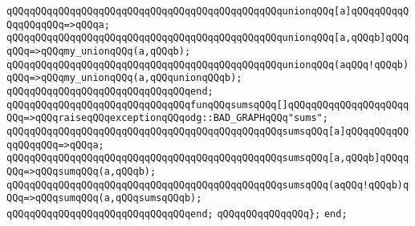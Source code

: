 \verb|qQQqqQQqqQQqqQQqqQQqqQQqqQQqqQQqqQQqqQQqqQQqqQQqunionqQQq[a]qQQqqQQqqQQqqQQqqQQq=>qQQqa;|\newline
\verb|qQQqqQQqqQQqqQQqqQQqqQQqqQQqqQQqqQQqqQQqqQQqqQQqunionqQQq[a,qQQqb]qQQqqQQq=>qQQqmy_unionqQQq(a,qQQqb);|\newline
\verb|qQQqqQQqqQQqqQQqqQQqqQQqqQQqqQQqqQQqqQQqqQQqqQQqunionqQQq(aqQQq!qQQqb)qQQq=>qQQqmy_unionqQQq(a,qQQqunionqQQqb);|\newline
\verb|qQQqqQQqqQQqqQQqqQQqqQQqqQQqqQQqend;|\newline
\newline
\verb|qQQqqQQqqQQqqQQqqQQqqQQqqQQqqQQqfunqQQqsumsqQQq[]qQQqqQQqqQQqqQQqqQQqqQQq=>qQQqraiseqQQqexceptionqQQqodg::BAD_GRAPHqQQq"sums";|\newline
\verb|qQQqqQQqqQQqqQQqqQQqqQQqqQQqqQQqqQQqqQQqqQQqqQQqsumsqQQq[a]qQQqqQQqqQQqqQQqqQQq=>qQQqa;|\newline
\verb|qQQqqQQqqQQqqQQqqQQqqQQqqQQqqQQqqQQqqQQqqQQqqQQqsumsqQQq[a,qQQqb]qQQqqQQq=>qQQqsumqQQq(a,qQQqb);|\newline
\verb|qQQqqQQqqQQqqQQqqQQqqQQqqQQqqQQqqQQqqQQqqQQqqQQqsumsqQQq(aqQQq!qQQqb)qQQq=>qQQqsumqQQq(a,qQQqsumsqQQqb);|\newline
\verb|qQQqqQQqqQQqqQQqqQQqqQQqqQQqqQQqend;|\newline
\verb|qQQqqQQqqQQqqQQq};|\newline
\verb|end;|\newline

